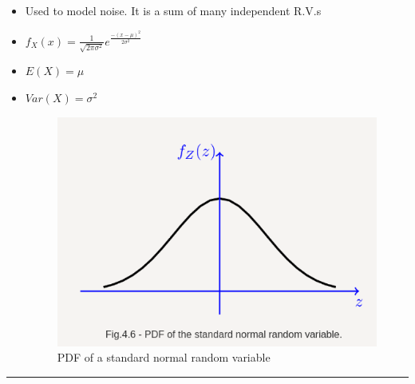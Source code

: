 \begin{itemize}
\item
  Used to model noise. It is a sum of many independent R.V.s
\item
  \(f_X(x) = \frac{1}{\sqrt{2\pi \sigma ^2}}e^\frac{-(x-\mu)^2}{2\sigma ^2}\)
\item
  \(E(X) = \mu\)
\item
  \(Var(X) = \sigma ^2\)

  \begin{figure}
  \centering
  \includegraphics{Lecture 13 Notes e842fef9a3e0449fa78bac59b75dbc5c/Screenshot_from_2021-08-06_23-11-46.png}
  \caption{PDF of a standard normal random variable}
  \end{figure}
\end{itemize}

\begin{center}\rule{0.5\linewidth}{0.5pt}\end{center}
